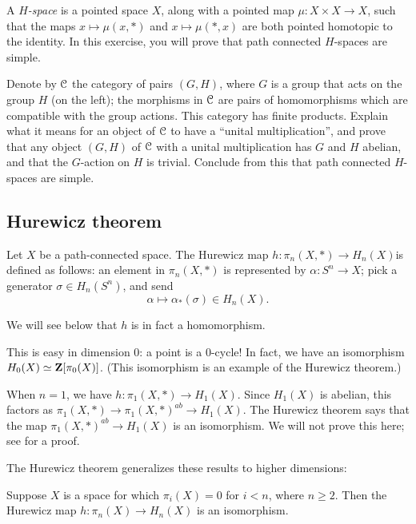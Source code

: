 \begin{exercise}
    A \emph{$H$-space} is a pointed space $X$, along with a pointed map $\mu:X\times X \to X$, such that the maps
    $x\mapsto \mu(x,\ast)$ and $x\mapsto \mu(\ast,x)$ are both pointed homotopic to the identity.
    In this exercise, you will prove that path connected $H$-spaces are simple.
    
    Denote by $\mathcal C$ the category of pairs $(G,H)$, where $G$ is a group that acts on the group $H$ (on the left); the morphisms
    in $\mathcal C$ are pairs of homomorphisms which are compatible with the group actions.
    This category has finite products.
    Explain what it means for an object of $\mathcal C$ to have a ``unital multiplication'', and prove that any object $(G,H)$ of $\mathcal C$
    with a unital multiplication has $G$ and $H$ abelian, and that the $G$-action on $H$ is trivial.
    Conclude from this that path connected $H$-spaces are simple.
\end{exercise}
\subsection{Hurewicz theorem}
\begin{definition}
    Let $X$ be a path-connected space.
    The Hurewicz map $h:\pi_n(X,\ast)\to H_n(X)$is defined as follows:
    an element in $\pi_n(X,\ast)$ is represented by $\alpha:S^n\to X$; pick a generator $\sigma\in H_n(S^n)$, and send
    $$\alpha\mapsto\alpha_\ast(\sigma)\in H_n(X).$$
\end{definition}
We will see below that $h$ is in fact a homomorphism.

This is easy in dimension $0$: a point is a $0$-cycle!
In fact, we have an isomorphism $H_0(X)\simeq \mathbf Z[\pi_0(X)]$.
(This isomorphism is an example of the Hurewicz theorem.)

When $n=1$, we have $h:\pi_1(X,\ast)\to H_1(X)$. Since $H_1(X)$ is abelian, this factors as
$\pi_1(X,\ast)\to \pi_1(X,\ast)^{ab}\to H_1(X)$.
The Hurewicz theorem says that the map $\pi_1(X,\ast)^{ab}\to H_1(X)$ is an isomorphism.
We will not prove this here; see \cite[Theorem 2A.1]{hatcher} for a proof.

The Hurewicz theorem generalizes these results to higher dimensions:
\begin{theorem}[Hurewicz]
    Suppose $X$ is a space for which $\pi_i(X) = 0$ for $i<n$, where $n\geq 2$.
    Then the Hurewicz map $h:\pi_n(X)\to H_n(X)$ is an isomorphism.
\end{theorem}

